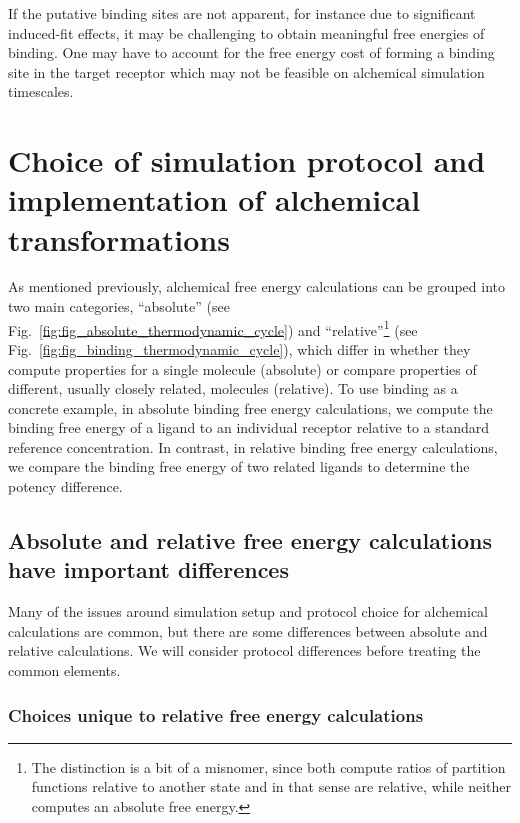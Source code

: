 \documentclass[9pt,bestpractices]{livecoms}
\begin{document}
If the putative binding sites are not apparent, for instance due to significant induced-fit effects, it may be challenging to obtain meaningful free energies of binding. One may have to account for the free energy cost of forming a binding site in the target receptor which may not be feasible on alchemical simulation timescales.

\section{Choice of simulation protocol and implementation of alchemical transformations}
\label{sec:simulation_protocol_choice}
As mentioned previously, alchemical free energy calculations can be grouped into two main categories, ``absolute'' (see Fig.~\ref{fig:fig_absolute_thermodynamic_cycle}) and ``relative''\footnote{The distinction is a bit of a misnomer, since both compute ratios of partition functions relative to another state and in that sense are relative, while neither computes an absolute free energy.} (see Fig.~\ref{fig:fig_binding_thermodynamic_cycle}), which differ in whether they compute properties for a single molecule (absolute) or compare properties of different, usually closely related, molecules (relative).
To use binding as a concrete example, in absolute binding free energy calculations, we compute the binding free energy of a ligand to an individual receptor relative to a standard reference concentration. In contrast, in relative binding free energy calculations, we compare the binding free energy of two related ligands to determine the potency difference.

\subsection{Absolute and relative free energy calculations have important differences}
Many of the issues around simulation setup and protocol choice for alchemical calculations are common, but there are some differences between absolute and relative calculations. We will consider protocol differences before treating the common elements.

\subsubsection{Choices unique to relative free energy calculations}
\label{sec:relative-fe-protocol}
\end{document}
